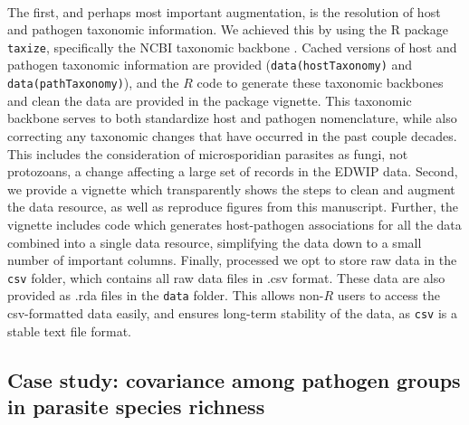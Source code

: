 \documentclass[12pt]{article}
\begin{document}
\paragraph*{}
The first, and perhaps most important augmentation, is the resolution of host and pathogen taxonomic information. We achieved this by using the R package \texttt{taxize}, specifically the NCBI taxonomic backbone \citep{chamberlain2013}. Cached versions of host and pathogen taxonomic information are provided (\texttt{data(hostTaxonomy)} and \texttt{data(pathTaxonomy)}), and the $R$ code to generate these taxonomic backbones and clean the data are provided in the package vignette. This taxonomic backbone serves to both standardize host and pathogen nomenclature, while also correcting any taxonomic changes that have occurred in the past couple decades. This includes the consideration of microsporidian parasites as fungi, not protozoans, a change affecting a large set of records in the EDWIP data. Second, we provide a vignette which transparently shows the steps to clean and augment the data resource, as well as reproduce figures from this manuscript. Further, the vignette includes code which generates host-pathogen associations for all the data combined into a single data resource, simplifying the data down to a small number of important columns. Finally, processed we opt to store raw data in the \texttt{csv} folder, which contains all raw data files in .csv format. These data are also provided as .rda files in the \texttt{data} folder. This allows non-$R$ users to access the csv-formatted data easily, and ensures long-term stability of the data, as \texttt{csv} is a stable text file format.





















\subsection*{Case study: covariance among pathogen groups in parasite species richness }
\end{document}
